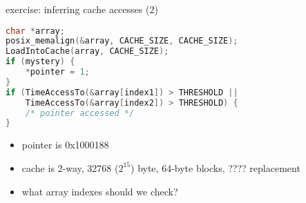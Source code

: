 

\begin{frame}[fragile]{exercise: inferring cache accesses (2)}
\begin{lstlisting}[language=C,style=smaller]
char *array;
posix_memalign(&array, CACHE_SIZE, CACHE_SIZE);
LoadIntoCache(array, CACHE_SIZE);
if (mystery) {
    *pointer = 1;
}
if (TimeAccessTo(&array[index1]) > THRESHOLD ||
    TimeAccessTo(&array[index2]) > THRESHOLD) {
    /* pointer accessed */
}
\end{lstlisting}
\begin{itemize}
\item pointer is 0x1000188
\item cache is 2-way, 32768 ($2^{15}$) byte, 64-byte blocks, ???? replacement
\item what array indexes should we check?
\end{itemize}
\end{frame}
